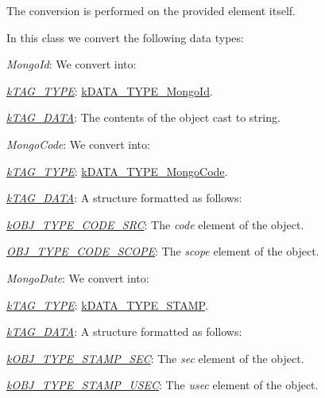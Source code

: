 The conversion is performed on the provided element itself.

In this class we convert the following data types\-:


\begin{DoxyItemize}
\item {\itshape Mongo\-Id\/}\-: We convert into\-: 
\begin{DoxyItemize}
\item {\itshape \hyperlink{}{k\-T\-A\-G\-\_\-\-T\-Y\-P\-E}\/}\-: \hyperlink{}{k\-D\-A\-T\-A\-\_\-\-T\-Y\-P\-E\-\_\-\-Mongo\-Id}. 
\item {\itshape \hyperlink{}{k\-T\-A\-G\-\_\-\-D\-A\-T\-A}\/}\-: The contents of the object cast to string. 
\end{DoxyItemize}
\item {\itshape Mongo\-Code\/}\-: We convert into\-: 
\begin{DoxyItemize}
\item {\itshape \hyperlink{}{k\-T\-A\-G\-\_\-\-T\-Y\-P\-E}\/}\-: \hyperlink{}{k\-D\-A\-T\-A\-\_\-\-T\-Y\-P\-E\-\_\-\-Mongo\-Code}. 
\item {\itshape \hyperlink{}{k\-T\-A\-G\-\_\-\-D\-A\-T\-A}\/}\-: A structure formatted as follows\-: 
\begin{DoxyItemize}
\item {\itshape \hyperlink{}{k\-O\-B\-J\-\_\-\-T\-Y\-P\-E\-\_\-\-C\-O\-D\-E\-\_\-\-S\-R\-C}\/}\-: The {\itshape code\/} element of the object. 
\item {\itshape \hyperlink{}{O\-B\-J\-\_\-\-T\-Y\-P\-E\-\_\-\-C\-O\-D\-E\-\_\-\-S\-C\-O\-P\-E}\/}\-: The {\itshape scope\/} element of the object. 
\end{DoxyItemize}
\end{DoxyItemize}
\item {\itshape Mongo\-Date\/}\-: We convert into\-: 
\begin{DoxyItemize}
\item {\itshape \hyperlink{}{k\-T\-A\-G\-\_\-\-T\-Y\-P\-E}\/}\-: \hyperlink{}{k\-D\-A\-T\-A\-\_\-\-T\-Y\-P\-E\-\_\-\-S\-T\-A\-M\-P}. 
\item {\itshape \hyperlink{}{k\-T\-A\-G\-\_\-\-D\-A\-T\-A}\/}\-: A structure formatted as follows\-: 
\begin{DoxyItemize}
\item {\itshape \hyperlink{}{k\-O\-B\-J\-\_\-\-T\-Y\-P\-E\-\_\-\-S\-T\-A\-M\-P\-\_\-\-S\-E\-C}\/}\-: The {\itshape sec\/} element of the object. 
\item {\itshape \hyperlink{}{k\-O\-B\-J\-\_\-\-T\-Y\-P\-E\-\_\-\-S\-T\-A\-M\-P\-\_\-\-U\-S\-E\-C}\/}\-: The {\itshape usec\/} element of the object. 

\end{DoxyItemize}
\end{DoxyItemize}
\end{DoxyItemize}
